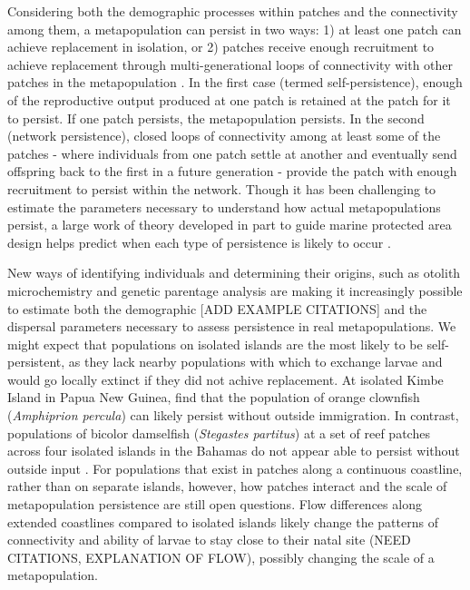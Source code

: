 \documentclass[12pt, oneside]{article}   	%
\begin{document}
Considering both the demographic processes within patches and the connectivity among them, a metapopulation can persist in two ways: 1) at least one patch can achieve replacement in isolation, or 2) patches receive enough recruitment to achieve replacement through multi-generational loops of connectivity with other patches in the metapopulation \citep{hastings_persistence_2006, burgess2014beyond}. In the first case (termed self-persistence), enough of the reproductive output produced at one patch is retained at the patch for it to persist. If one patch persists, the metapopulation persists. In the second (network persistence), closed loops of connectivity among at least some of the patches - where individuals from one patch settle at another and eventually send offspring back to the first in a future generation - provide the patch with enough recruitment to persist within the network. Though it has been challenging to estimate the parameters necessary to understand how actual metapopulations persist, a large work of theory developed in part to guide marine protected area design helps predict when each type of persistence is likely to occur \citep[i.e., large patches relative to the mean dispersal distance are likely to be self-persistent,][]{botsford_dependence_2001}. %

New ways of identifying individuals and determining their origins, such as otolith microchemistry and genetic parentage analysis \citep[e.g.][]{wang2004sibship, wang2014estimation} are making it increasingly possible to estimate both the demographic [ADD EXAMPLE CITATIONS] and the dispersal \citep[e.g.][]{hameed2016inverse, almany2017larval} parameters necessary to assess persistence in real metapopulations. We might expect that populations on isolated islands are the most likely to be self-persistent, as they lack nearby populations with which to exchange larvae and would go locally extinct if they did not achive replacement. At isolated Kimbe Island in Papua New Guinea, \cite{salles_coral_2015} find that the population of orange clownfish (\textit{Amphiprion percula}) can likely persist without outside immigration. In contrast, populations of bicolor damselfish (\textit{Stegastes partitus}) at a set of reef patches across four isolated islands in the Bahamas do not appear able to persist without outside input \citep{johnson2018integrating}. For populations that exist in patches along a continuous coastline, rather than on separate islands, however, how patches interact and the scale of metapopulation persistence are still open questions. Flow differences along extended coastlines compared to isolated islands likely change the patterns of connectivity and ability of larvae to stay close to their natal site (NEED CITATIONS, EXPLANATION OF FLOW), possibly changing the scale of a metapopulation. %
\end{document}
